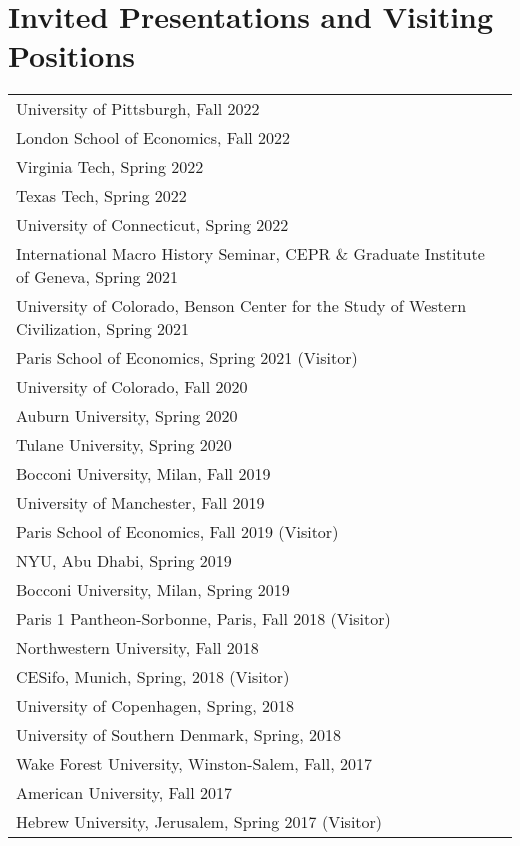 \documentclass[11pt,fullpage]{article}
\begin{document}
\setlength{\extrarowheight}{1pt}

\pagebreak

\section*{Invited Presentations and Visiting Positions}

\begin{longtable}{ll}
	University of Pittsburgh, Fall 2022\\
	London School of Economics, Fall 2022\\
	Virginia Tech, Spring 2022 \\
	Texas Tech, Spring 2022 \\
	University of Connecticut, Spring 2022 \\
	International Macro History Seminar, CEPR \& Graduate Institute of Geneva, Spring 2021 \\
	University of Colorado, Benson Center for the Study of Western Civilization, Spring 2021 \\
	Paris School of Economics, Spring 2021 (Visitor) \\
	University of Colorado, Fall 2020 \\
	Auburn University, Spring 2020 \\
	Tulane University, Spring 2020 \\
	Bocconi University, Milan, Fall 2019 \\
	University of Manchester, Fall 2019 \\
	Paris School of Economics, Fall 2019 (Visitor) \\
	NYU, Abu Dhabi, Spring 2019 \\
	Bocconi University, Milan, Spring 2019  \\
	Paris 1 Pantheon-Sorbonne, Paris, Fall 2018 (Visitor) \\
	Northwestern University, Fall 2018 \\
	CESifo, Munich, Spring, 2018 (Visitor) \\
	University of Copenhagen, Spring, 2018 \\
	University of Southern Denmark, Spring, 2018 \\
	Wake Forest University, Winston-Salem, Fall, 2017 \\
	American University, Fall 2017 \\
	Hebrew University, Jerusalem, Spring 2017 (Visitor) \\

\end{longtable}
\end{document}

